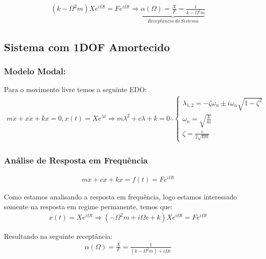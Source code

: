 \documentclass{article}
\begin{document}
\begin{align}
    (k - \Omega^2m)Xe^{i\Omega t} = Fe^{i\Omega t} \Rightarrow  \underbrace{\alpha(\Omega) =\frac{X}{F} = \frac{1}{k - \Omega^2m}}_{Receptancia\ do\ Sistema}
\end{align}

\subsection{Sistema com 1DOF Amortecido}

\subsubsection*{Modelo Modal:}
Para o movimento livre temos a seguinte EDO:
\begin{align*}
    m\ddot x + x\dot x + kx = 0, x(t) = Xe^{\lambda t} \Rightarrow m\lambda^2 + c\lambda + k = 0 \therefore \begin{cases}
                                                                                                                \lambda_{1,2} = -\zeta \omega_n \pm i \omega_n \sqrt{1-\zeta^2} \\ \omega_n = \sqrt{\frac{k}{m}} \\ \zeta = \frac{c}{2\sqrt{km}}
                                                                                                            \end{cases}
\end{align*}

\subsubsection*{Análise de Resposta em Frequência}
\begin{align*}
    m\ddot x + c\dot x + kx = f(t) = Fe^{i\Omega t}
\end{align*}

Como estamos analisando a resposta em frequência, logo estamos interessado somente na resposta em regime permanente, temos que:
\begin{align*}
    x(t) = Xe^{i\Omega t} \Rightarrow (-\Omega^2m + i\Omega c + k)Xe^{i\Omega t} = Fe^{i\Omega t}
\end{align*}

Resultando na seguinte receptância:
\begin{align}
    \alpha(\Omega) = \frac{X}{F} = \frac{1}{(k - \Omega^2 m) + i \Omega c}
\end{align}
\end{document}
